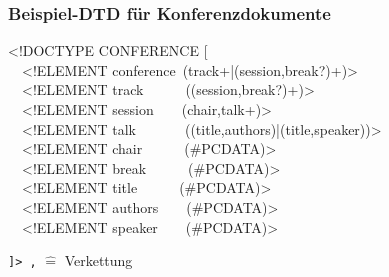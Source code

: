     \begin{frame}
      \frametitle{Beispiel-DTD für Konferenzdokumente}
      
% 
      \begin{exampleblock}{}
        \begin{small}
          \begin{ttfamily}
            <!DOCTYPE CONFERENCE [ \\
            ~~<!ELEMENT conference~(track+|(session,break?)+)>        \\
            ~~<!ELEMENT track~~~~~~((session,break?)+)>               \\
            ~~<!ELEMENT session~~~~(chair,talk+)>                     \\
            ~~<!ELEMENT talk~~~~~~~((title,authors)|(title,speaker))> \\
            ~~<!ELEMENT chair~~~~~~(\#PCDATA)>                        \\
            ~~<!ELEMENT break~~~~~~(\#PCDATA)>                        \\
            ~~<!ELEMENT title~~~~~~(\#PCDATA)>                        \\
            ~~<!ELEMENT authors~~~~(\#PCDATA)>                        \\
            ~~<!ELEMENT speaker~~~~(\#PCDATA)>                        \\
          \end{ttfamily}
          \texttt{]> \hspace*{\fill} ,} $\hat=$ Verkettung
        \end{small}
      \end{exampleblock}


\end{frame}

